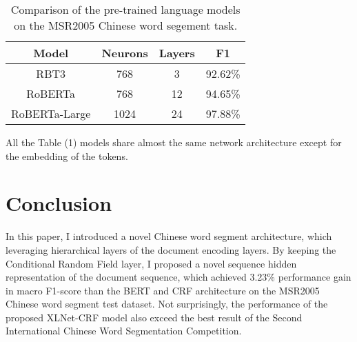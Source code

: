 \documentclass[11pt,a4paper]{article}
\begin{document}
\begin{table}
\centering
\begin{tabular}{cccc}
\hline
\textbf{Model} & \textbf{Neurons}& \textbf{Layers} & \textbf{F1} \\
\hline
RBT3 & 768 & 3 & 92.62\% \\
RoBERTa & 768 & 12 & 94.65\% \\
RoBERTa-Large & 1024 & 24 & 97.88\% \\
\hline
\end{tabular}
\caption{Comparison of the pre-trained language models on the MSR2005 Chinese word segement task.}
\end{table}


All the Table (1) models share almost the same network architecture except for the embedding of the tokens.

%

\section{Conclusion}

In this paper, I introduced a novel Chinese word segment architecture, which leveraging hierarchical layers of the document encoding layers.
By keeping the Conditional Random Field layer, I proposed a novel sequence hidden representation of the document sequence, which achieved 3.23\% performance gain in macro F1-score than
the BERT and CRF architecture on the MSR2005 Chinese word segment test dataset.
Not surprisingly, the performance of the proposed XLNet-CRF model also exceed the best result of the Second International Chinese Word Segmentation Competition.





\end{document}
